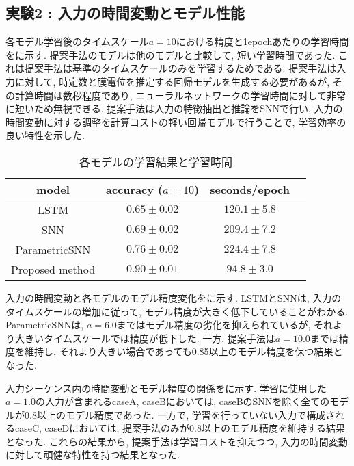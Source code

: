 \makeatletter %
\subsection{実験2 : 入力の時間変動とモデル性能}

各モデル学習後のタイムスケール$a=10$における精度と1epochあたりの学習時間をに示す.
提案手法のモデルは他のモデルと比較して, 短い学習時間であった.
これは提案手法は基準のタイムスケールのみを学習するためである.
提案手法は入力に対して, 時定数と膜電位を推定する回帰モデルを生成する必要があるが, その計算時間は数秒程度であり, ニューラルネットワークの学習時間に対して非常に短いため無視できる.
提案手法は入力の特徴抽出と推論をSNNで行い, 入力の時間変動に対する調整を計算コストの軽い回帰モデルで行うことで, 学習効率の良い特性を示した.
\begin{table}[htb]
    \centering
    \caption{各モデルの学習結果と学習時間}
    \label{sec4:tab:exp2}
    \begin{tabular}{cccc}
        \hline
        \textbf{model}&\textbf{accuracy ($a=10$)}&\textbf{seconds/epoch}\\
        \hline
        LSTM&$0.65\pm0.02$&$120.1\pm5.8$\\
        SNN&$0.69\pm0.02$&$209.4\pm7.2$\\
        ParametricSNN&$0.76\pm0.02$&$224.4\pm7.8$\\
        Proposed method&$0.90\pm0.01$&$94.8\pm3.0$\\
    \end{tabular}
\end{table}

入力の時間変動と各モデルのモデル精度変化をに示す.
LSTMとSNNは, 入力のタイムスケールの増加に従って, モデル精度が大きく低下していることがわかる.
ParametricSNNは, $a=6.0$まではモデル精度の劣化を抑えられているが, それより大きいタイムスケールでは精度が低下した.
一方, 提案手法は$a=10.0$までは精度を維持し, それより大きい場合であっても0.85以上のモデル精度を保つ結果となった.

入力シーケンス内の時間変動とモデル精度の関係をに示す.
学習に使用した$a=1.0$の入力が含まれるcaseA, caseBにおいては, caseBのSNNを除く全てのモデルが0.8以上のモデル精度であった.
一方で, 学習を行っていない入力で構成されるcaseC, caseDにおいては, 提案手法のみが0.8以上のモデル精度を維持する結果となった.
これらの結果から, 提案手法は学習コストを抑えつつ, 入力の時間変動に対して頑健な特性を持つ結果となった.